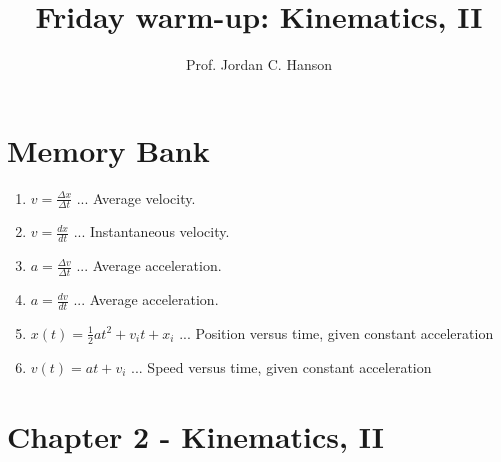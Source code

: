 \documentclass{article}
\begin{document}
\twocolumn

\title{Friday warm-up: Kinematics, II}
\author{Prof. Jordan C. Hanson}

\maketitle

\section{Memory Bank}

\begin{enumerate}
\item $v = \frac{\Delta x}{\Delta t}$ ... Average velocity.
\item $v = \frac{dx}{dt}$ ... Instantaneous velocity.
\item $a = \frac{\Delta v}{\Delta t}$ ... Average acceleration.
\item $a = \frac{dv}{dt}$ ... Average acceleration.
\item $x(t) = \frac{1}{2}at^2 + v_i t + x_i$ ... Position versus time, given constant acceleration
\item $v(t) = at + v_i$ ... Speed versus time, given constant acceleration
\end{enumerate}

\section{Chapter 2 - Kinematics, II}
\end{document}
